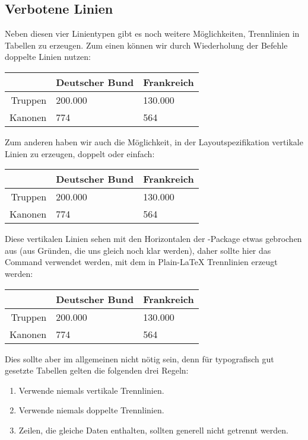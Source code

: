 \subsection{Verbotene Linien}
Neben diesen vier Linientypen gibt es noch weitere Möglichkeiten, Trennlinien in Tabellen zu erzeugen.
Zum einen können wir durch Wiederholung der Befehle doppelte Linien nutzen:
\begin{latexlisting}
	\begin{tabular}{r l l}
		\toprule
		& Deutscher Bund & Frankreich \\ \midrule \midrule
		Truppen & 200.000 & 130.000 \\ \cmidrule{2-3}
		Kanonen & 774 & 564 \\ \bottomrule
	\end{tabular}
\end{latexlisting}
Zum anderen haben wir auch die Möglichkeit, in der Layoutspezifikation vertikale Linien zu erzeugen, doppelt oder einfach:
\begin{latexlisting}
	\begin{tabular}{|r||l|l}
		\toprule
		& Deutscher Bund & Frankreich \\ \midrule \midrule
		Truppen & 200.000 & 130.000 \\ \cmidrule{2-3}
		Kanonen & 774 & 564 \\ \bottomrule
	\end{tabular}
\end{latexlisting}
Diese vertikalen Linien sehen mit den Horizontalen der -Package etwas gebrochen aus (aus Gründen, die uns gleich noch klar werden), daher sollte hier das Command  verwendet werden, mit dem in Plain-\LaTeX{} Trennlinien erzeugt werden:
\begin{latexlisting}
	\begin{tabular}{|r||l|l}
		\hline
		& Deutscher Bund & Frankreich \\ \hline \hline
		Truppen & 200.000 & 130.000 \\ \hline
		Kanonen & 774 & 564 \\ \hline
	\end{tabular}
\end{latexlisting}
Dies sollte aber im allgemeinen nicht nötig sein, denn für typografisch gut gesetzte Tabellen gelten die folgenden drei Regeln:
\begin{enumerate}
	\item Verwende niemals vertikale Trennlinien.
	\item Verwende niemals doppelte Trennlinien.
	\item Zeilen, die gleiche Daten enthalten, sollten generell nicht getrennt werden.
\end{enumerate}
